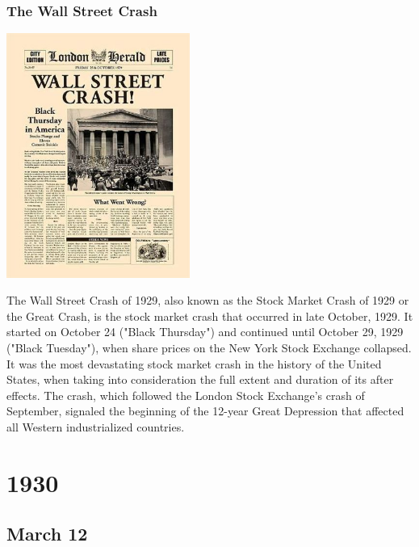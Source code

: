 \documentclass[11pt]{report}
\begin{document}
\subsection{The Wall Street Crash}
\vspace{2mm}\begin{center}\includegraphics[width=6cm]{./img/wallStreetCrash.jpg}\end{center}
The Wall Street Crash of 1929, also known as the Stock Market Crash of 1929 or the Great Crash, is the stock market crash that occurred in late October, 1929. It started on October 24 ("Black Thursday") and continued until October 29, 1929 ("Black Tuesday"), when share prices on the New York Stock Exchange collapsed.\\
It was the most devastating stock market crash in the history of the United States, when taking into consideration the full extent and duration of its after effects. The crash, which followed the London Stock Exchange's crash of September, signaled the beginning of the 12-year Great Depression that affected all Western industrialized countries.

\chapter{1930}
\section{March 12}
\end{document}
